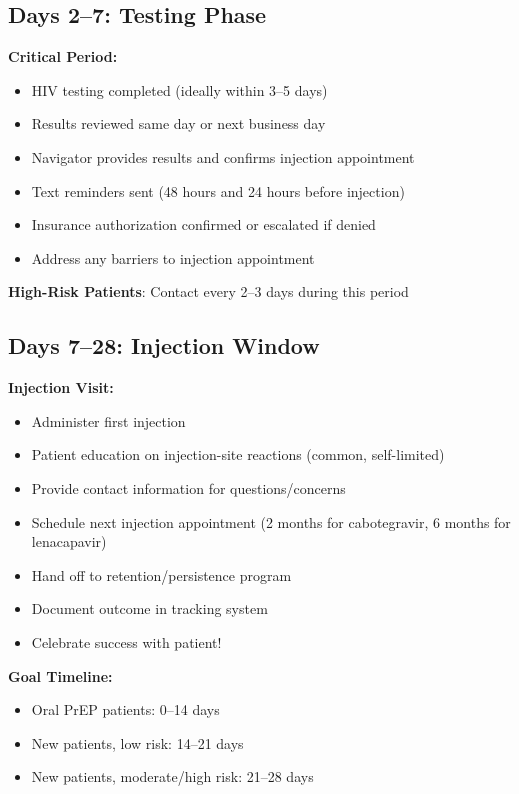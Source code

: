 \documentclass[11pt]{article}
\begin{document}
\subsection{Days 2--7: Testing Phase}

\begin{tcolorbox}[colback=blue!5!white,colframe=blue!75!black,breakable]
\textbf{Critical Period:}

\begin{itemize}[label=$\square$,leftmargin=*]
\item HIV testing completed (ideally within 3--5 days)
\item Results reviewed same day or next business day
\item Navigator provides results and confirms injection appointment
\item Text reminders sent (48 hours and 24 hours before injection)
\item Insurance authorization confirmed or escalated if denied
\item Address any barriers to injection appointment
\end{itemize}

\textbf{High-Risk Patients}: Contact every 2--3 days during this period
\end{tcolorbox}

\subsection{Days 7--28: Injection Window}

\begin{tcolorbox}[colback=green!10!white,colframe=green!75!black,title=\textbf{TARGET: FIRST INJECTION},breakable]
\textbf{Injection Visit:}

\begin{itemize}[label=$\square$,leftmargin=*]
\item Administer first injection
\item Patient education on injection-site reactions (common, self-limited)
\item Provide contact information for questions/concerns
\item Schedule next injection appointment (2 months for cabotegravir, 6 months for lenacapavir)
\item Hand off to retention/persistence program
\item Document outcome in tracking system
\item Celebrate success with patient!
\end{itemize}

\textbf{Goal Timeline:}
\begin{itemize}
\item Oral PrEP patients: 0--14 days
\item New patients, low risk: 14--21 days
\item New patients, moderate/high risk: 21--28 days
\end{itemize}
\end{tcolorbox}
\end{document}
